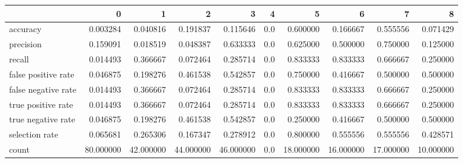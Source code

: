 \begin{tabular}{lrrrrrrrrr}
\toprule
{} &          0 &          1 &          2 &          3 &    4 &          5 &          6 &          7 &          8 \\
\midrule
accuracy            &   0.003284 &   0.040816 &   0.191837 &   0.115646 &  0.0 &   0.600000 &   0.166667 &   0.555556 &   0.071429 \\
precision           &   0.159091 &   0.018519 &   0.048387 &   0.633333 &  0.0 &   0.625000 &   0.500000 &   0.750000 &   0.125000 \\
recall              &   0.014493 &   0.366667 &   0.072464 &   0.285714 &  0.0 &   0.833333 &   0.833333 &   0.666667 &   0.250000 \\
false positive rate &   0.046875 &   0.198276 &   0.461538 &   0.542857 &  0.0 &   0.750000 &   0.416667 &   0.500000 &   0.500000 \\
false negative rate &   0.014493 &   0.366667 &   0.072464 &   0.285714 &  0.0 &   0.833333 &   0.833333 &   0.666667 &   0.250000 \\
true positive rate  &   0.014493 &   0.366667 &   0.072464 &   0.285714 &  0.0 &   0.833333 &   0.833333 &   0.666667 &   0.250000 \\
true negative rate  &   0.046875 &   0.198276 &   0.461538 &   0.542857 &  0.0 &   0.250000 &   0.416667 &   0.500000 &   0.500000 \\
selection rate      &   0.065681 &   0.265306 &   0.167347 &   0.278912 &  0.0 &   0.800000 &   0.555556 &   0.555556 &   0.428571 \\
count               &  80.000000 &  42.000000 &  44.000000 &  46.000000 &  0.0 &  18.000000 &  16.000000 &  17.000000 &  10.000000 \\
\bottomrule
\end{tabular}
